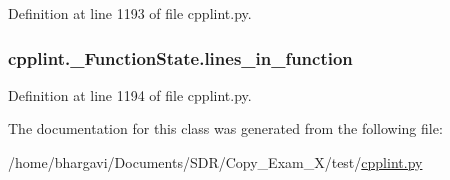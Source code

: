 Definition at line 1193 of file cpplint.\+py.

\subsubsection[{\texorpdfstring{lines\+\_\+in\+\_\+function}{lines_in_function}}]{\setlength{\rightskip}{0pt plus 5cm}cpplint.\+\_\+\+Function\+State.\+lines\+\_\+in\+\_\+function}\hypertarget{classcpplint_1_1___function_state_a886f5d476adc81f499a711750a399aa2}{}\label{classcpplint_1_1___function_state_a886f5d476adc81f499a711750a399aa2}


Definition at line 1194 of file cpplint.\+py.



The documentation for this class was generated from the following file\+:\begin{DoxyCompactItemize}
\item 
/home/bhargavi/\+Documents/\+S\+D\+R/\+Copy\+\_\+\+Exam\+\_\+X/test/\hyperlink{cpplint_8py}{cpplint.\+py}\end{DoxyCompactItemize}
